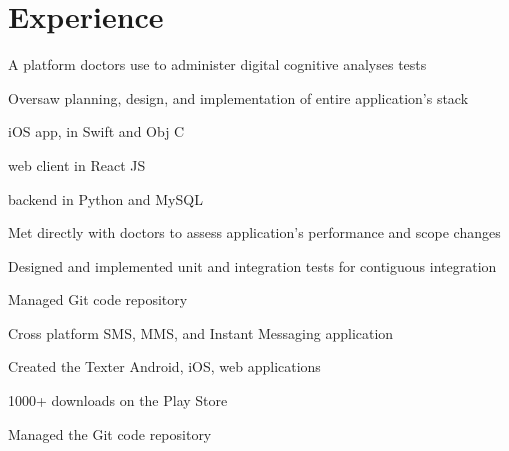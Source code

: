 \documentclass[]{johns_resume_style}
\begin{document}
\begin{minipage}[t]{0.68\textwidth} 


\section{Experience}



\vspace{\topsep}
\begin{tightemize}
\item A platform doctors use to administer digital cognitive analyses tests 
\item Oversaw planning, design, and implementation of entire application's stack
\begin{tightemize}
\vspace{\topsep} %
\item  iOS app, in Swift and Obj C 
\item  web client in React JS 
\item  backend in Python and MySQL
\vspace{\topsep} %

\end{tightemize}
\item Met directly with doctors to assess application's performance and scope changes
\item Designed and implemented unit and integration tests for contiguous integration
\item Managed Git code repository \end{tightemize}
\sectionsep

\begin{tightemize}
    \item Cross platform SMS, MMS, and Instant Messaging application
    \item Created the Texter Android, iOS, web applications
    \item 1000+ downloads on the Play Store
    \item Managed the Git code repository
\end{tightemize}
\sectionsep



\end{minipage}
\end{document}
